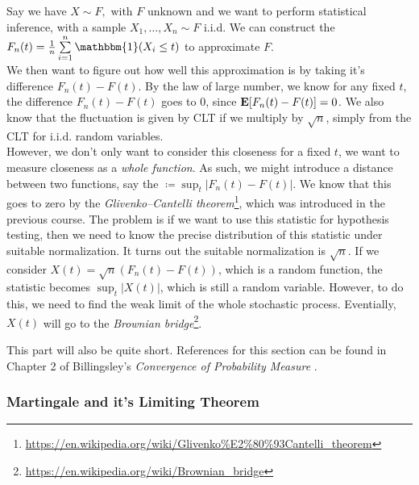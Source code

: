 \documentclass[../main/main.tex]{subfiles}
\begin{document}
\begin{example}
	Say we have \(X \sim F, \text{ with $F$ unknown}\) and we want to perform statistical inference, with a sample $X_1, \ldots,X_n \sim F$ i.i.d. We can construct the  $F_n(t) = \frac{1}{n} \sum\limits_{i=1}^{n} \mathbbm{1}(X_i \leq t)$ to approximate $F$.\\

	We then want to figure out how well this approximation is by taking it's difference $F_n(t) - F(t)$. By the law of large number, we know for any fixed $t$, the difference \(F_n(t) - F(t)\) goes to 0, since $\text{\textbf{E}}[F_n(t)-F(t)] = 0$. We also know that the fluctuation is given by CLT if we multiply by $\sqrt{n}$, simply from the CLT for i.i.d. random variables.\\

	However, we don't only want to consider this closeness for a fixed $t$, we want to measure closeness as a \textit{whole function}. As such, we might introduce a distance between two functions, say the  $\coloneqq \sup_t | F_n (t) - F(t)|$. We know that this goes to zero by the \textit{Glivenko–Cantelli theorem}\footnote{\url{https://en.wikipedia.org/wiki/Glivenko\%E2\%80\%93Cantelli\_theorem}}, which was introduced in the previous course. The problem is if we want to use this statistic for hypothesis testing, then we need to know the precise distribution of this statistic under suitable normalization. It turns out the suitable normalization is $\sqrt{n}$. If we consider $X(t)=\sqrt{n}(F_n (t) - F(t))$, which is a random function, the statistic becomes $\sup_t|X(t)|$, which is still a random variable. However, to do this, we need to find the weak limit of the whole stochastic process. Eventially, $X(t)$ will go to the \textit{Brownian bridge}\footnote{\url{https://en.wikipedia.org/wiki/Brownian\_bridge}}.
\end{example}

\begin{remark}
	This part will also be quite short.
	References for this section can be found in Chapter 2 of Billingsley's \textit{Convergence of Probability Measure} \cite{Bill86}.
\end{remark}

\subsubsection{Martingale and it's Limiting Theorem}
\end{document}
